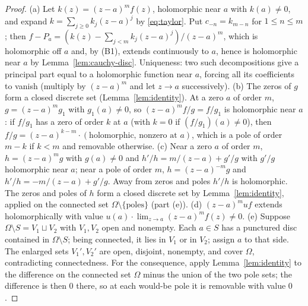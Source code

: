 \documentclass[11pt]{article}
\theoremstyle{definition}
\begin{document}
\begin{proof}
(a) Let $k(z)=(z-a)^{m}f(z)$, holomorphic near $a$ with $k(a)\ne0$, and expand $k=\sum_{j\ge0}k_j(z-a)^{j}$ by \eqref{eq:taylor}. Put $c_{-n}=k_{m-n}$ for $1\le n\le m$; then $f-P_a=(k(z)-\sum_{j<m}k_j(z-a)^{j})/(z-a)^{m}$, which is holomorphic off $a$ and, by (B1), extends continuously to $a$, hence is holomorphic near $a$ by Lemma~\ref{lem:cauchy-disc}. Uniqueness: two such decompositions give a principal part equal to a holomorphic function near $a$, forcing all its coefficients to vanish (multiply by $(z-a)^{m}$ and let $z\to a$ successively).
(b) The zeros of $g$ form a closed discrete set (Lemma~\ref{lem:identity}). At a zero $a$ of order $m$, $g=(z-a)^{m}g_1$ with $g_1(a)\ne0$, so $(z-a)^{m}f/g=f/g_1$ is holomorphic near $a$: if $f/g_1$ has a zero of order $k$ at $a$ (with $k=0$ if $(f/g_1)(a)\ne0$), then $f/g=(z-a)^{k-m}\cdot(\text{holomorphic, nonzero at }a)$, which is a pole of order $m-k$ if $k<m$ and removable otherwise.
(c) Near a zero $a$ of order $m$, $h=(z-a)^{m}g$ with $g(a)\ne0$ and $h'/h=m/(z-a)+g'/g$ with $g'/g$ holomorphic near $a$; near a pole of order $m$, $h=(z-a)^{-m}g$ and $h'/h=-m/(z-a)+g'/g$. Away from zeros and poles $h'/h$ is holomorphic. The zeros and poles of $h$ form a closed discrete set by Lemma~\ref{lem:identity}, applied on the connected set $\Omega\setminus\{\text{poles}\}$ (part (e)).
(d) $(z-a)^{m}uf$ extends holomorphically with value $u(a)\cdot\lim_{z\to a}(z-a)^{m}f(z)\ne0$.
(e) Suppose $\Omega\setminus S=V_1\sqcup V_2$ with $V_1,V_2$ open and nonempty. Each $a\in S$ has a punctured disc contained in $\Omega\setminus S$; being connected, it lies in $V_1$ or in $V_2$; assign $a$ to that side. The enlarged sets $V_1',V_2'$ are open, disjoint, nonempty, and cover $\Omega$, contradicting connectedness. For the consequence, apply Lemma~\ref{lem:identity} to the difference on the connected set $\Omega$ minus the union of the two pole sets; the difference is then $0$ there, so at each would-be pole it is removable with value $0$.
\end{proof}
\end{document}
